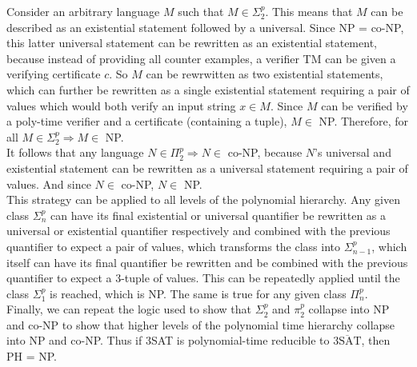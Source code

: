 \documentclass[letterpaper,notitlepage,twoside]{article}
\renewcommand{\implies}{\Rightarrow} %
\begin{document}
Consider an arbitrary language $M$ such that $M \in \Sigma_2^p$. This means that $M$ can be described as an existential statement followed by a universal. Since NP = co-NP, this latter universal statement can be rewritten as an existential statement, because instead of providing all counter examples, a verifier TM can be given a verifying certificate $c$. So $M$ can be rewrwitten as two existential statements, which can further be rewritten as a single existential statement requiring a pair of values which would both verify an input string $x \in M$. Since $M$ can be verified by a poly-time verifier and a certificate (containing a tuple), $M \in$ NP. Therefore, for all $M \in \Sigma_2^p \implies M \in$ NP. \\

It follows that any language $N \in \Pi_2^p \implies N \in$ co-NP, because $N$'s universal and existential statement can be rewritten as a universal statement requiring a pair of values. And since $N \in$ co-NP, $N \in$ NP. \\

This strategy can be applied to all levels of the polynomial hierarchy. Any given class $\Sigma_n^p$ can have its final existential or universal quantifier be rewritten as a universal or existential quantifier respectively and combined with the previous quantifier to expect a pair of values, which transforms the class into $\Sigma_{n-1}^p$, which itself can have its final  quantifier be rewritten and be combined with the previous quantifier to expect a 3-tuple of values. This can be repeatedly applied until the class $\Sigma_1^p$ is reached, which is NP. The same is true for any given class $\Pi_n^p$. \\

Finally, we can repeat the logic used to show that $\Sigma_2^p$ and $\pi_2^p$ collapse into NP and co-NP to show that higher levels of the polynomial time hierarchy collapse into NP and co-NP. Thus if 3SAT is polynomial-time reducible to $\overline{\text{3SAT}}$, then PH = NP.
\end{document}
